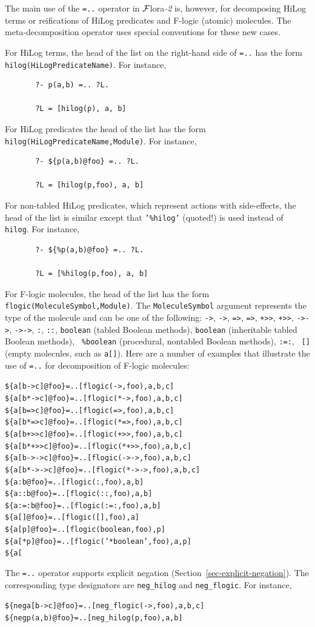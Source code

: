 \documentclass[11pt]{article}
\newcommand{\FLORA}{{\mbox{\sc ${\cal F}${lora}\rm\emph{-2}}}\xspace}
\begin{document}
The main use of the {\tt =..} operator in \FLORA is, however, for
decomposing HiLog terms or reifications of HiLog predicates and F-logic
(atomic) molecules. The meta-decomposition operator uses special
conventions for these new cases.

For HiLog terms, the head of the list on the right-hand side of {\tt =..}
has the form {\tt hilog(HiLogPredicateName)}. For instance, 
\begin{verbatim}
       ?- p(a,b) =.. ?L.
 
       ?L = [hilog(p), a, b]
\end{verbatim}
For HiLog predicates the head of the list has the form {\tt
  hilog(HiLogPredicateName,Module)}. For instance,
\begin{verbatim}
       ?- ${p(a,b)@foo} =.. ?L.
 
       ?L = [hilog(p,foo), a, b]
\end{verbatim}
For non-tabled HiLog predicates, which represent actions with side-effects,
the head of the list is similar except that {\tt '\%hilog'} (quoted!) is 
used instead of {\tt hilog}.  For instance,
\begin{verbatim}
       ?- ${%p(a,b)@foo} =.. ?L.
 
       ?L = [%hilog(p,foo), a, b]
\end{verbatim}

For F-logic molecules, the head of the list has the form
{\tt flogic(MoleculeSymbol,Module)}. The {\tt MoleculeSymbol} argument
represents the type of the molecule and can be one of the following:
{\tt ->}, {\tt *->}, {\tt =>}, {\tt *=>}, {\tt +>>}, {\tt *+>>}, {\tt ->->},
{\tt *->->}, {\tt :}, {\tt ::}, {\tt boolean} (tabled Boolean methods),
{\tt *boolean} (inheritable tabled Boolean methods), {\tt 
  \%boolean} (procedural, nontabled Boolean methods), {\tt :=:}, {\tt
  []} (empty molecules, such as {\tt a[]}). Here are a number of examples
that illustrate the use of {\tt =..} for decomposition of F-logic molecules:
\begin{alltt}
    \$\{a[b->c]@foo\} =.. [flogic(->,foo), a, b, c]
    \$\{a[b*->c]@foo\} =.. [flogic(*->,foo), a, b, c]
    \$\{a[b=>c]@foo\} =.. [flogic(=>,foo), a, b, c]
    \$\{a[b*=>c]@foo\} =.. [flogic(*=>,foo), a, b, c]
    \$\{a[b+>>c]@foo\} =.. [flogic(+>>,foo), a, b, c]
    \$\{a[b*+>>c]@foo\} =.. [flogic(*+>>,foo), a, b, c]
    \$\{a[b->->c]@foo\} =.. [flogic(->->,foo), a, b, c]
    \$\{a[b*->->c]@foo\} =.. [flogic(*->->,foo), a, b, c]
    \$\{a:b@foo\} =.. [flogic(:,foo), a, b]
    \$\{a::b@foo\} =.. [flogic(::,foo), a, b]
    \$\{a:=:b@foo\} =.. [flogic(:=:,foo), a, b]
    \$\{a[]@foo\} =.. [flogic([],foo), a]
    \$\{a[p]@foo\} =.. [flogic(boolean,foo), p]
    \$\{a[*p]@foo\} =.. [flogic('*boolean',foo), a, p]
    \$\{a[%
\end{alltt}
The {\tt =..} operator supports explicit negation
(Section~\ref{sec-explicit-negation}). The corresponding 
type designators are {\tt neg\_hilog} and {\tt neg\_flogic}. For instance,
\begin{alltt}
     \$\{neg a[b->c]@foo\} =.. [neg_flogic(->,foo), a, b, c]
     \$\{neg p(a,b)@foo\} =.. [neg_hilog(p,foo), a, b]
\end{alltt}
\end{document}
